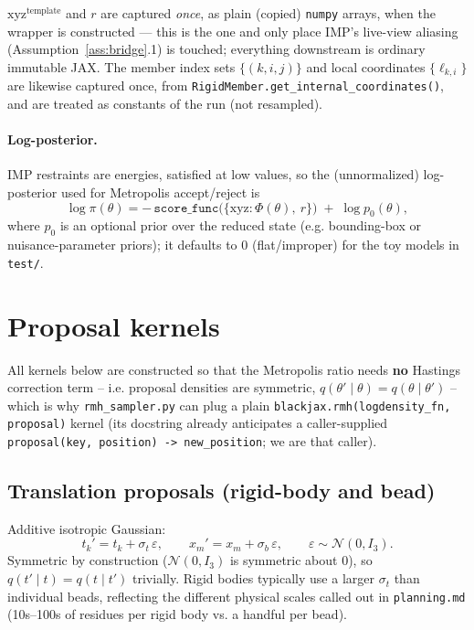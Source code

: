 \documentclass[11pt]{article}
\begin{document}
$\mathrm{xyz}^{\text{template}}$ and $r$ are captured \emph{once}, as plain
(copied) \texttt{numpy} arrays, when the wrapper is constructed --- this is
the one and only place IMP's live-view aliasing (Assumption~\ref{ass:bridge}.1)
is touched; everything downstream is ordinary immutable JAX. The member
index sets $\{(k,i,j)\}$ and local coordinates $\{\ell_{k,i}\}$ are likewise
captured once, from \texttt{RigidMember.get\_internal\_coordinates()}, and
are treated as constants of the run (not resampled).

\paragraph{Log-posterior.} IMP restraints are energies, satisfied at low
values, so the (unnormalized) log-posterior used for Metropolis accept/reject
is
\begin{equation}
  \label{eq:logpost}
  \log \pi(\theta) = -\,\texttt{score\_func}\big(\{\text{xyz}: \Phi(\theta),\ r\}\big) \;+\; \log p_0(\theta),
\end{equation}
where $p_0$ is an optional prior over the reduced state (e.g. bounding-box or
nuisance-parameter priors); it defaults to $0$ (flat/improper) for the toy
models in \texttt{test/}.

\section{Proposal kernels}
\label{sec:proposals}

All kernels below are constructed so that the Metropolis ratio needs
\textbf{no} Hastings correction term -- i.e. proposal densities are symmetric,
$q(\theta' \mid \theta) = q(\theta \mid \theta')$ -- which is why
\texttt{rmh\_sampler.py} can plug a plain \texttt{blackjax.rmh(logdensity\_fn,
proposal)} kernel (its docstring already anticipates a caller-supplied
\texttt{proposal(key, position) -> new\_position}; we are that caller).

\subsection{Translation proposals (rigid-body and bead)}

Additive isotropic Gaussian:
\begin{equation}
  t_k' = t_k + \sigma_t \,\varepsilon, \qquad x_m' = x_m + \sigma_b\,\varepsilon,
  \qquad \varepsilon \sim \mathcal{N}(0, I_3).
\end{equation}
Symmetric by construction ($\mathcal{N}(0,I_3)$ is symmetric about $0$), so
$q(t' \mid t) = q(t \mid t')$ trivially. Rigid bodies typically use a larger
$\sigma_t$ than individual beads, reflecting the different physical scales
called out in \texttt{planning.md} (10s--100s of residues per rigid body vs.
a handful per bead).
\end{document}
